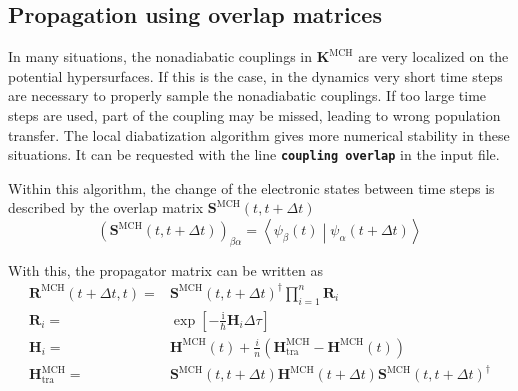 \documentclass[a4paper,10pt,DIV=15,openany]{scrbook}
\newcommand{\ttt}[1]{\textbf{\texttt{#1}}}
\newcommand{\I}{\ensuremath{\mathrm{i}}}
\newcommand{\VEC}[1]{\ensuremath{\mathbf{#1}}}
\begin{document}
\subsection{Propagation using overlap matrices}

In many situations, the nonadiabatic couplings in $\VEC{K}^{\text{MCH}}$ are very localized on the potential hypersurfaces. If this is the case, in the dynamics very short time steps are necessary to properly sample the nonadiabatic couplings. If too large time steps are used, part of the coupling may be missed, leading to wrong population transfer. The local diabatization algorithm gives more numerical stability in these situations. It can be requested with the line \ttt{coupling overlap} in the input file.

Within this algorithm, the change of the electronic states between time steps is described by the overlap matrix $\VEC{S}^{\text{MCH}}(t,t+\Delta t)$
\begin{equation}
  \left(\VEC{S}^{\text{MCH}}(t,t+\Delta t)\right)_{\beta\alpha}=
  \left\langle
    \psi_\beta(t)
  \middle|
    \psi_\alpha(t+\Delta t)
  \right\rangle
\end{equation}

With this, the propagator matrix can be written as
\begin{align}
  \VEC{R}^{\text{MCH}}(t+\Delta t,t)=&
  \VEC{S}^{\text{MCH}}(t,t+\Delta t)^\dagger\prod\limits_{i=1}^{n}
  \VEC{R}_i\\
  \VEC{R}_i=&
  \exp\left[
      -\frac{\I}{\hbar}\VEC{H}_i\Delta\tau
  \right]\\
  \VEC{H}_i=&
  \VEC{H}^{\text{MCH}}(t) + \frac{i}{n}
  \left(
    \VEC{H}^{\text{MCH}}_{\text{tra}}
    -\VEC{H}^{\text{MCH}}(t)
  \right)\label{eq:ham_propl}\\
  \VEC{H}^{\text{MCH}}_{\text{tra}}=&
    \VEC{S}^{\text{MCH}}(t,t+\Delta t)
    \VEC{H}^{\text{MCH}}(t+\Delta t)
    \VEC{S}^{\text{MCH}}(t,t+\Delta t)^\dagger
\end{align}








\end{document}
